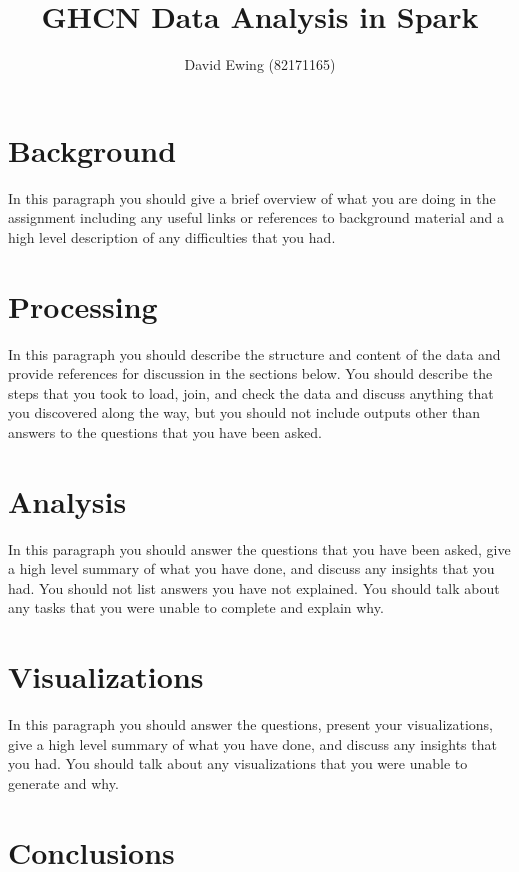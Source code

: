 \documentclass[11pt]{article}
\title{GHCN Data Analysis in Spark}
\author{David Ewing (82171165)}
\date{\DTMnow}
\begin{document}
\maketitle

\tableofcontents

\newpage

\section{Background}

In this paragraph you should give a brief overview of what you are doing in the assignment including any useful links or references to background material and a high level description of any difficulties that you had.

\section{Processing}

In this paragraph you should describe the structure and content of the data and provide references for discussion in the sections below. You should describe the steps that you took to load, join, and check the data and discuss anything that you discovered along the way, but you should not include outputs other than answers to the questions that you have been asked.

\section{Analysis}

In this paragraph you should answer the questions that you have been asked, give a high level summary of what you have done, and discuss any insights that you had. You should not list answers you have not explained. You should talk about any tasks that you were unable to complete and explain why.

\section{Visualizations}

In this paragraph you should answer the questions, present your visualizations, give a high level summary of what you have done, and discuss any insights that you had. You should talk about any visualizations that you were unable to generate and why.

\section{Conclusions}
\end{document}
